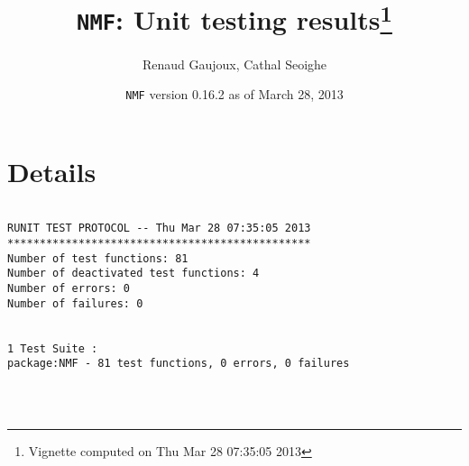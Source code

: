 \documentclass[10pt]{article}
\author{Renaud Gaujoux, Cathal Seoighe}
\title{\texttt{NMF}: Unit testing results\footnote{Vignette computed  on Thu Mar 28 07:35:05 2013}}
\date{\texttt{NMF} version 0.16.2 as of March 28, 2013}
\begin{document}
\maketitle

\section{Details}
\begin{verbatim}

RUNIT TEST PROTOCOL -- Thu Mar 28 07:35:05 2013 
*********************************************** 
Number of test functions: 81 
Number of deactivated test functions: 4 
Number of errors: 0 
Number of failures: 0 

 
1 Test Suite : 
package:NMF - 81 test functions, 0 errors, 0 failures




\end{verbatim}
\end{document}
